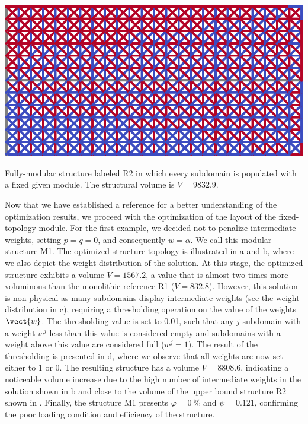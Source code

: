\begin{marginfigure}
    \centering
    \includegraphics[width=\linewidth]{figures/06_DMO/00_cantilever_extremes/cell.pdf}
    \caption{Fully-modular structure labeled R2 in which every subdomain is populated with a fixed given module. The structural volume is $V=9832.9$.}
    \label{fig:06_cant_BC_cell}
\end{marginfigure}

Now that we have established a reference for a better understanding of the optimization results, we proceed with the optimization of the layout of the fixed-topology module. For the first example, we decided not to penalize intermediate weights, setting $p=q=0$, and consequently $w=\alpha$. We call this modular structure M1. The optimized structure topology is illustrated in a and b, where we also depict the weight distribution of the solution. At this stage, the optimized structure exhibits a volume $V = 1567.2$, a value that is almost two times more voluminous than the monolithic reference R1 ($V=832.8$). However, this solution is non-physical as many subdomains display intermediate weights (see the weight distribution in c), requiring a thresholding operation on the value of the weights $\vect{w}$. The thresholding value is set to 0.01, such that any $j$ subdomain with a weight $w^j$ less than this value is considered empty and subdomains with a weight above this value are considered full ($w^j=1$). The result of the thresholding is presented in d, where we observe that all weights are now set either to 1 or 0. The resulting structure has a volume $V = 8808.6$, indicating a noticeable volume increase due to the high number of intermediate weights in the solution shown in b and close to the volume of the upper bound structure R2 shown in . Finally, the structure M1 presents $\varphi=\qty{0}{\percent}$ and $\psi=0.121$, confirming the poor loading condition and efficiency of the structure.

